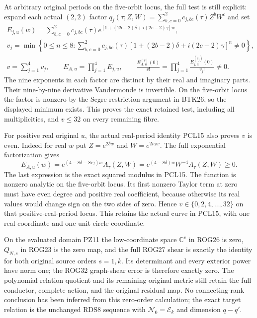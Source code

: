 At arbitrary original periods on the five-orbit locus, the full test
is still explicit: expand each actual $(2,2)$ factor
$q_j(\tau;Z,W)=\sum_{b,c=0}^2c_{j,bc}(\tau)Z^bW^c$ and set
\[
 \begin{gathered}
 E_{j,u}(w)=\sum_{b,c=0}^2c_{j,bc}(\tau)
       e^{[1+(2b-2)\delta+i(2c-2)\gamma]w},\\
 v_j=\min\left\{0\le n\le8:
    \sum_{b,c=0}^2c_{j,bc}(\tau)
        [1+(2b-2)\delta+i(2c-2)\gamma]^n\ne0\right\},\\
 v=\sum_{j=1}^4v_j,\qquad
 E_{A,u}=\prod_{j=1}^4E_{j,u},\qquad
 \frac{E_{A,u}^{(v)}(0)}{v!}
      =\prod_{j=1}^4\frac{E_{j,u}^{(v_j)}(0)}{v_j!}\ne0.
 \end{gathered}\tag{PZ12}
\]
The nine exponents in each factor are distinct by their real and
imaginary parts. Their nine-by-nine derivative Vandermonde is
invertible. On the five-orbit locus the factor is nonzero by the
Segre restriction argument in BTK26, so the displayed minimum exists.
This proves the exact retained test, including all multiplicities,
and $v\le32$ on every remaining fibre.

For positive real original $u$, the actual real-period identity PCL15
also proves $v$ is even. Indeed for real $w$ put
$Z=e^{2\delta w}$ and $W=e^{2i\gamma w}$. The full exponential
factorization gives
\[
 E_{A,u}(w)=e^{(4-8\delta-8i\gamma)w}A_\tau(Z,W)
           =e^{(4-8\delta)w}W^{-4}A_\tau(Z,W)\ge0.
 \tag{PZ13}
\]
The last expression is the exact squared modulus in PCL15. The
function is nonzero analytic on the five-orbit locus. Its first
nonzero Taylor term at zero must have even degree and positive real
coefficient, because otherwise its real values would change sign on
the two sides of zero. Hence $v\in\{0,2,4,\ldots,32\}$ on that
positive-real-period locus. This retains the actual curve in PCL15,
with one real coordinate and one unit-circle coordinate.

On the evaluated domain PZ11 the low-coordinate space $\mathbb C^v$
in ROG26 is zero, $Q_{N,s}$ in ROG23 is the zero map, and the full
ROG27 shear is exactly the identity for both original source orders
$s=1,k$. Its determinant and every exterior power have norm one;
the ROG32 graph-shear error is therefore exactly zero. The polynomial
relation quotient and its remaining original metric still retain
the full conductor, complete action, and the original residual map.
No connecting-rank conclusion has been inferred from this zero-order
calculation; the exact target relation is the unchanged RDS8 sequence
with $\mathscr N_0=\mathscr E_k$ and dimension $q-q'$.

